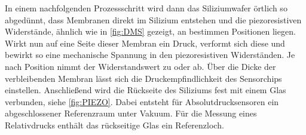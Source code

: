 In einem nachfolgenden Prozessschritt wird dann das Siliziumwafer örtlich so abgedünnt, dass Membranen direkt im Silizium entstehen und die piezoresistiven Widerstände, ähnlich wie in \ref{fig:DMS} gezeigt, an bestimmen Positionen liegen. Wirkt nun auf eine Seite dieser Membran ein Druck, verformt sich diese und bewirkt so eine mechanische Spannung in den piezoresistiven Widerständen. Je nach Position nimmt der Widerstandswert zu oder ab. Über die Dicke der verbleibenden Membran lässt sich die Druckempfindlichkeit des Sensorchips einstellen. Anschließend wird die Rückseite des Siliziums fest mit einem Glas verbunden, siehe \ref{fig:PIEZO}. Dabei entsteht für Absolutdrucksensoren ein abgeschlossener Referenzraum unter Vakuum. Für die Messung eines Relativdrucks enthält das rückseitige Glas ein Referenzloch.

\begin{figure}[H]	
    \centering
    

\end{figure}
